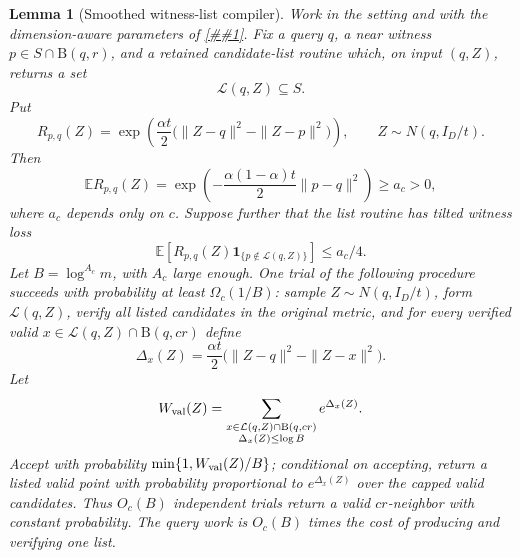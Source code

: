 \documentclass[10pt]{article}
\newcommand{\cref}[1]{\ref{##1}}
\newtheorem{lemma}[theorem]{Lemma}
\theoremstyle{definition}
\newcommand{\E}{\mathbb{E}}
\newcommand{\Ball}{\mathrm{B}}
\begin{document}
\begin{lemma}[Smoothed witness-list compiler]
   \label{lem:smoothed-witness-list-compiler}
   Work in the setting and with the dimension-aware parameters of
   \cref{cor:query-centered-cell-reweighting}.  Fix a query \(q\), a near
   witness \(p\in S\cap\Ball(q,r)\), and a retained candidate-list routine
   which, on input \((q,Z)\), returns a set
   \[
      \mathcal L(q,Z)\subseteq S .
   \]
   Put
   \[
      R_{p,q}(Z)
      =
      \exp\!\left(
         \frac{\alpha t}{2}
         \bigl(\|Z-q\|^2-\|Z-p\|^2\bigr)
      \right),
      \qquad Z\sim N(q,I_D/t).
      \tag{WL0}
   \]
   Then
   \[
      \E R_{p,q}(Z)
      =
      \exp\!\left(
         -\frac{\alpha(1-\alpha)t}{2}\|p-q\|^2
      \right)
      \ge a_c>0 ,
      \tag{WL1}
   \]
   where \(a_c\) depends only on \(c\).  Suppose further that the list routine
   has tilted witness loss
   \[
      \E\left[
         R_{p,q}(Z)\mathbf 1_{\{p\notin\mathcal L(q,Z)\}}
      \right]
      \le a_c/4 .
      \tag{WL2}
   \]
   Let \(B=\log^{A_c}m\), with \(A_c\) large enough.  One trial of the
   following procedure succeeds with probability at least
   \(\Omega_c(1/B)\): sample \(Z\sim N(q,I_D/t)\), form
   \(\mathcal L(q,Z)\), verify all listed candidates in the original metric,
   and for every verified valid \(x\in\mathcal L(q,Z)\cap\Ball(q,cr)\) define
   \[
      \Delta_x(Z)=
      \frac{\alpha t}{2}
      \bigl(\|Z-q\|^2-\|Z-x\|^2\bigr).
   \]
   Let
   \[
      W_{\rm val}(Z)
      =
      \sum_{\substack{x\in\mathcal L(q,Z)\cap\Ball(q,cr)\\
                      \Delta_x(Z)\le\log B}}
      e^{\Delta_x(Z)} .
   \]
   Accept with probability \(\min\{1,W_{\rm val}(Z)/B\}\); conditional on
   accepting, return a listed valid point with probability proportional to
   \(e^{\Delta_x(Z)}\) over the capped valid candidates.  Thus
   \(O_c(B)\) independent trials return a valid \(cr\)-neighbor with constant
   probability.  The query work is \(O_c(B)\) times the cost of producing and
   verifying one list.
\end{lemma}
\end{document}
